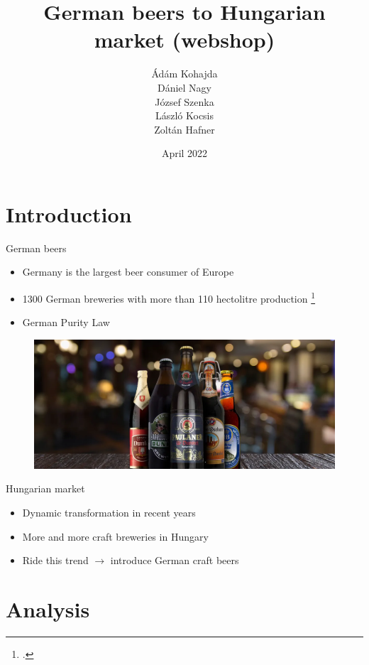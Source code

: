 \documentclass[aspectratio=43]{beamer}
\title[Group Assignment] %
{German beers to Hungarian market (webshop)}
\subtitle{}
\author[Marketing]
{Ádám Kohajda \\ Dániel Nagy \\ József Szenka \\ László Kocsis \\ Zoltán Hafner}
\date[April 2022] %
{April 2022}
\begin{document}
\begin{frame}[plain]
    \titlepage
\end{frame}


\section{Introduction}

\begin{frame}{German beers}
\begin{itemize}
   \item Germany is the largest beer consumer of Europe
   \item 1300 German breweries with more than 110 hectolitre production \footcite{statista1}
   \item German Purity Law
\end{itemize}

\begin{figure}[H]
  \centering
  \includegraphics[width=0.6\linewidth]{pics/german_beer.png}
\end{figure}

\end{frame}

\begin{frame}{Hungarian market}
\begin{itemize}
   \item Dynamic transformation in recent years
   \item More and more craft breweries in Hungary
   \item Ride this trend $\rightarrow$ introduce German craft beers
\end{itemize}



\end{frame}



\section{Analysis}
\end{document}
